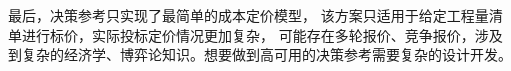\documentclass{xmu}
\begin{document}
最后，决策参考只实现了最简单的成本定价模型，
该方案只适用于给定工程量清单进行标价，实际投标定价情况更加复杂，
可能存在多轮报价、竞争报价，涉及到复杂的经济学、博弈论知识。想要做到高可用的决策参考需要复杂的设计开发。
\end{document}
